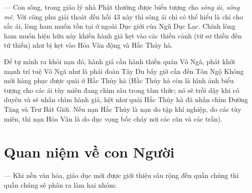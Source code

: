— Con sông, trong giáo lý nhà Phật thường được biểu tượng cho \emph{sông ái, sông mê}. Với công phu giải thoát đến hồi 43 này thì sông ái chỉ có thể hiểu là chỉ cho sắc ái, lòng ham muốn tồn tại ở ngoài Dục giới của Ngũ Dục Lạc. Chính lòng ham muốn hiện hữu này khiến hành giả kẹt vào các thiền cảnh (từ sơ thiền đến tứ thiền) như bị kẹt vào Hỏa Vân động và Hắc Thủy hà.

Để tự mình ra khỏi nạn đó, hành giả cần hành thiền quán Vô Ngã, phát khởi mạnh trí tuệ Vô Ngã như là phái đoàn Tây Du bấy giờ cần đến Tôn Ngộ Không mới hàng phục được quái ở Hắc Thủy hà (Hắc Thủy hà còn là hình ảnh biểu tượng cho các ái tùy miên đang chìm sâu trong tâm thức; nó sẽ trỗi dậy khi có duyên và sẽ nhấn chìm hành giả, hệt như quái Hắc Thủy hà đã nhấn chìm Đường Tăng và Trư Bát Giới. Nếu nạn Hắc Thủy là nạn do tập khí nghiệp, do các tùy miên, thì nạn Hỏa Vân là do dục vọng bốc cháy nơi các căn và các trần).

\section{Quan niệm về con Người} %
\label{sec:43_con_nguoi}

— Khi nền văn hóa, giáo dục mới được giới thiệu sâu rộng đến quần chúng thì quần chúng sẽ phân ra làm hai nhóm:

